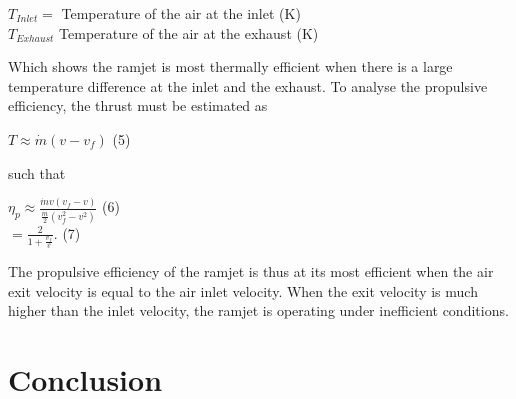 \documentclass[12pt,onecolumn]{IEEEtran}
\begin{document}
\begin{flushleft}
\begin{center}
\vspace{1mm}
$T_{Inlet} = $ Temperature of the air at the inlet (K)\\
\vspace{1mm}
$T_{Exhaust} $ Temperature of the air at the exhaust (K)\\
\end{center}
Which shows the ramjet is most thermally efficient when there is a large temperature difference at the inlet and the exhaust.
\vspace{3mm}
To analyse the propulsive efficiency, the thrust must be estimated as\\
\begin{center}
$T\approx\dot{m}(v-v_f)$ (5)
\end{center}
\vspace{1mm}
such that\\
\begin{center}
$\eta_p\approx\frac{\dot{m}v(v_f-v)}{\frac{\dot{m}}{2}(v_f^2-v^2)}$ (6)\\
\vspace{1mm}
$=\frac{2}{1+\frac{v_f}{v}}$. (7)
\end{center}
The propulsive efficiency of the ramjet is thus at its most efficient when the air exit velocity is equal to the air inlet velocity. When the exit velocity is much higher than the inlet velocity, the ramjet is operating under inefficient conditions.
\end{flushleft}
\section{Conclusion}



\end{document}
